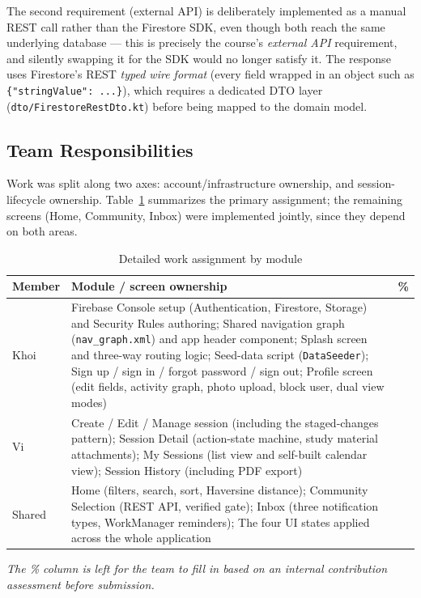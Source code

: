 The second requirement (external API) is deliberately implemented as a manual REST call rather than the Firestore SDK, even though both reach the same underlying database — this is precisely the course's \emph{external API} requirement, and silently swapping it for the SDK would no longer satisfy it. The response uses Firestore's REST \emph{typed wire format} (every field wrapped in an object such as \texttt{\{"stringValue": ...\}}), which requires a dedicated DTO layer (\texttt{dto/FirestoreRestDto.kt}) before being mapped to the domain model.

\subsection{Team Responsibilities}

Work was split along two axes: account/infrastructure ownership, and session-lifecycle ownership. Table~\ref{tab:assignment} summarizes the primary assignment; the remaining screens (Home, Community, Inbox) were implemented jointly, since they depend on both areas.

\begin{table}[h]
\centering
\caption{Detailed work assignment by module}
\label{tab:assignment}
\begin{tabular}{p{2.3cm}p{9.5cm}p{1.6cm}}
\toprule
\textbf{Member} & \textbf{Module / screen ownership} & \textbf{\%} \\
\midrule
Khoi &
Firebase Console setup (Authentication, Firestore, Storage) and Security Rules authoring; \newline
Shared navigation graph (\texttt{nav\_graph.xml}) and app header component; \newline
Splash screen and three-way routing logic; \newline
Seed-data script (\texttt{DataSeeder}); \newline
Sign up / sign in / forgot password / sign out; \newline
Profile screen (edit fields, activity graph, photo upload, block user, dual view modes)
& \\
\addlinespace
Vi &
Create / Edit / Manage session (including the staged-changes pattern); \newline
Session Detail (action-state machine, study material attachments); \newline
My Sessions (list view and self-built calendar view); \newline
Session History (including PDF export)
& \\
\addlinespace
Shared &
Home (filters, search, sort, Haversine distance); \newline
Community Selection (REST API, verified gate); \newline
Inbox (three notification types, WorkManager reminders); \newline
The four UI states applied across the whole application
& \\
\bottomrule
\end{tabular}
\end{table}

\emph{The \% column is left for the team to fill in based on an internal contribution assessment before submission.}
